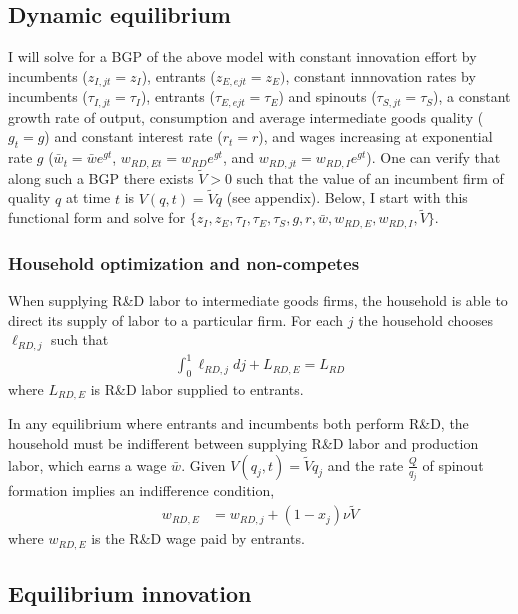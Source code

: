 \documentclass[12pt,english]{article}
\theoremstyle{remark}
\begin{document}
\subsection{Dynamic equilibrium}

I will solve for a BGP of the above model with constant innovation effort by incumbents ($z_{I,jt} = z_I$), entrants ($z_{E,ejt} = z_{E})$, constant innnovation rates by incumbents ($\tau_{I,jt} = \tau_I$), entrants ($\tau_{E,ejt} = \tau_E$) and spinouts ($\tau_{S,jt} = \tau_S$), a constant growth rate of output, consumption and average intermediate goods quality ($g_t = g$) and constant interest rate ($r_t = r$), and wages increasing at exponential rate $g$ ($\bar{w}_t = \bar{w} e^{gt}$, $w_{RD,Et} = w_{RD}e^{gt}$, and $w_{RD,jt} = w_{RD,I}e^{gt}$). One can verify that along such a BGP there exists $\tilde{V} > 0$ such that the value of an incumbent firm of quality $q$ at time $t$ is $V(q,t) = \tilde{V}q$ (see appendix). Below, I start with this functional form and solve for $\{z_I,z_E,\tau_I,\tau_E,\tau_S,g,r,\bar{w},w_{RD,E},w_{RD,I},\tilde{V}\}$.

\subsubsection{Household optimization and non-competes}

When supplying R\&D labor to intermediate goods firms, the household is able to direct its supply of labor to a particular firm. For each $j$ the household chooses $\ell_{RD,j}$ such that
\begin{align}
\int_0^1 \ell_{RD,j} dj + L_{RD,E} = L_{RD}
\end{align}
where $L_{RD,E}$ is R\&D labor supplied to entrants. 

In any equilibrium where entrants and incumbents both perform R\&D, the household must be indifferent between supplying R\&D labor and production labor, which earns a wage $\bar{w}$. Given $V(q_j,t) = \tilde{V}q_j$ and the rate $\frac{Q}{q_j}$ of spinout formation implies an indifference condition, 
\begin{align}
	w_{RD,E} &= w_{RD,j} + (1-x_j) \nu  \tilde{V} \label{eq:RD_worker_indifference}
\end{align}
where $w_{RD,E}$ is the R\&D wage paid by entrants.


\subsection{Equilibrium innovation}
\end{document}
